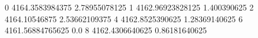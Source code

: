 0 4164.3583984375 2.78955078125
1 4162.96923828125 1.400390625
2 4164.10546875 2.53662109375
4 4162.8525390625 1.28369140625
6 4161.56884765625 0.0
8 4162.4306640625 0.86181640625
